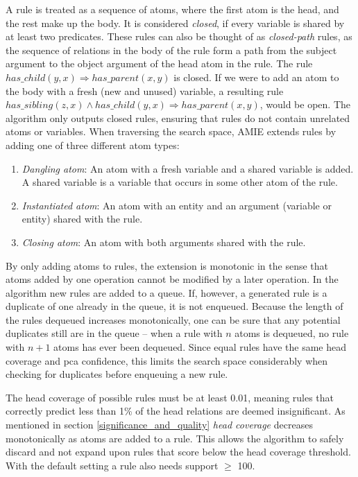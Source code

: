 A rule is treated as a sequence of atoms, where the first atom is the head, and the rest make up the body. It is considered \textit{closed}, if every variable is shared by at least two predicates. These rules can also be thought of as \textit{closed-path} rules, as the sequence of relations in the body of the rule form a path from the subject argument to the object argument of the head atom in the rule. The rule $has\_child(y, x) \Rightarrow has\_parent(x, y)$ is closed. If we were to add an atom to the body with a fresh (new and unused) variable, a resulting rule $has\_sibling(z, x) \wedge has\_child(y, x) \Rightarrow has\_parent(x, y)$, would be open. The algorithm only outputs closed rules, ensuring that rules do not contain unrelated atoms or variables. When traversing the search space, AMIE extends rules by adding one of three different atom types:
\begin{enumerate}
    \item \textit{Dangling atom}: An atom with a fresh variable and a shared variable is added. A shared variable is a variable that occurs in some other atom of the rule.
    \item \textit{Instantiated atom}: An atom with an entity and an argument (variable or entity) shared with the rule.
    \item \textit{Closing atom}: An atom with both arguments shared with the rule.
\end{enumerate}

By only adding atoms to rules, the extension is monotonic in the sense that atoms added by one operation cannot be modified by a later operation. In the algorithm new rules are added to a queue. If, however, a generated rule is a duplicate of one already in the queue, it is not enqueued. Because the length of the rules dequeued increases monotonically, one can be sure that any potential duplicates still are in the queue -- when a rule with $n$ atoms is dequeued, no rule with $n+1$ atoms has ever been dequeued. Since equal rules have the same head coverage and \gls{pca} confidence, this limits the search space considerably when checking for duplicates before enqueuing a new rule.

The head coverage of possible rules must be at least 0.01, meaning rules that correctly predict less than 1\% of the head relations are deemed insignificant. As mentioned in section \ref{significance_and_quality} \textit{head coverage} decreases monotonically as atoms are added to a rule. This allows the algorithm to safely discard and not expand upon rules that score below the head coverage threshold. With the default setting a rule also needs support $\geq$ 100. %

